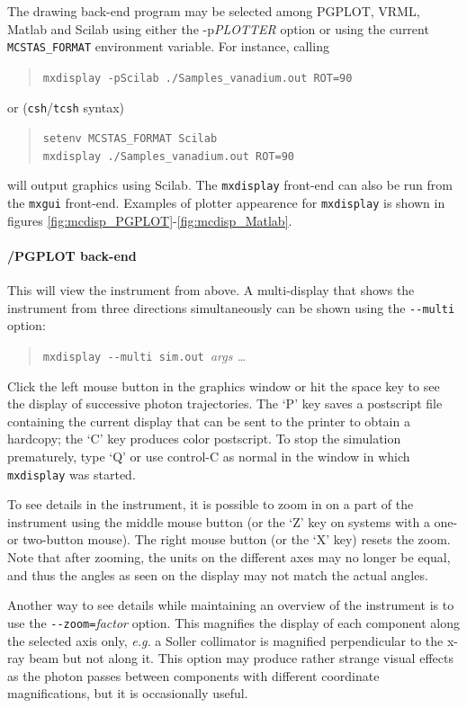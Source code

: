    
The drawing back-end program may be selected among PGPLOT, VRML, Matlab and Scilab using either the -p\textit{PLOTTER} option or using the current \verb+MCSTAS_FORMAT+ environment variable. 
For instance, calling
\begin{quote}
  \verb+mxdisplay -pScilab ./Samples_vanadium.out ROT=90+
\end{quote}
or (\verb+csh+/\verb+tcsh+ syntax)
\begin{quote}
  \verb+setenv MCSTAS_FORMAT Scilab+\\
  \verb+mxdisplay ./Samples_vanadium.out ROT=90+
\end{quote}
will output graphics using Scilab.
The \verb+mxdisplay+ front-end can also be run from the \verb+mxgui+ front-end.
Examples of plotter appearence for \verb+mxdisplay+ is shown in figures
 \ref{fig:mcdisp_PGPLOT}-\ref{fig:mcdisp_Matlab}.

\paragraph{\MCX /PGPLOT back-end}

This will view the instrument from above. A
multi-display that shows the instrument from three directions
simultaneously can be shown using the \verb+--multi+ option:
\begin{quote}
  \verb+mxdisplay --multi sim.out +\textit{args \ldots}
\end{quote}

Click the left mouse button in the graphics window or hit the space key
to see the display of successive photon trajectories. The `P' key saves
a postscript file containing the current display that can be sent to the
printer to obtain a hardcopy; the `C' key produces color postscript.
To stop the simulation
prematurely, type `Q' or use control-C as normal in the window in which
\verb+mxdisplay+ was started.

To see details in the instrument, it is possible to zoom in on a part of
the instrument using the middle mouse button (or the `Z' key on systems
with a one- or two-button mouse). The right mouse button (or the `X'
key) resets the zoom. Note that after zooming, the units on the
different axes may no longer be equal, and thus the angles as seen on
the display may not match the actual angles.

Another way to see details while maintaining an overview of the
instrument is to use the \verb+--zoom=+\textit{factor} option. This
magnifies the display of each component along the selected axis only,
{\em e.g.} a Soller collimator is magnified perpendicular to the x-ray beam
but not along it. This option may produce rather strange visual effects
as the photon passes between components with different coordinate
magnifications, but it is occasionally useful.

